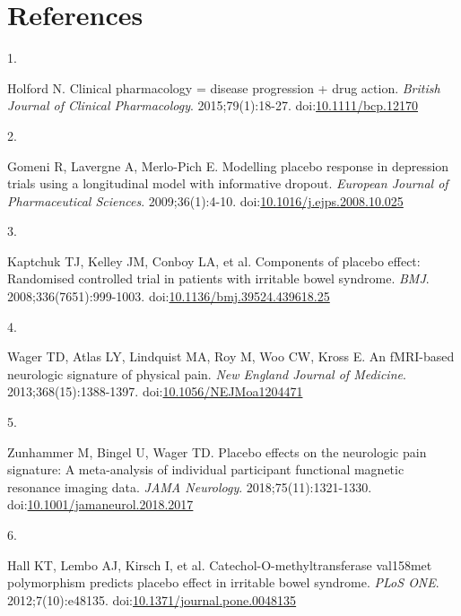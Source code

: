 \documentclass[
  11pt,
]{article}
\newlength{\cslhangindent}
\newlength{\csllabelwidth}
\newenvironment{CSLReferences}[2] %
 {\begin{list}{}{%
  \setlength{\itemindent}{0pt}
  \setlength{\leftmargin}{0pt}
  \setlength{\parsep}{0pt}
  \ifodd #1
   \setlength{\leftmargin}{\cslhangindent}
   \setlength{\itemindent}{-1\cslhangindent}
  \fi
  \setlength{\itemsep}{#2\baselineskip}}}
 {\end{list}}
\newcommand{\CSLLeftMargin}[1]{\parbox[t]{\csllabelwidth}{\strut#1\strut}}
\newcommand{\CSLRightInline}[1]{\parbox[t]{\linewidth - \csllabelwidth}{\strut#1\strut}}
\begin{document}
\section{References}\label{references}

\protect{}\label{refs}
\begin{CSLReferences}{0}{1}
\CSLLeftMargin{1. }%
\CSLRightInline{Holford N. Clinical pharmacology = disease progression + drug action. \emph{British Journal of Clinical Pharmacology}. 2015;79(1):18-27. doi:\href{https://doi.org/10.1111/bcp.12170}{10.1111/bcp.12170}}

\CSLLeftMargin{2. }%
\CSLRightInline{Gomeni R, Lavergne A, Merlo-Pich E. Modelling placebo response in depression trials using a longitudinal model with informative dropout. \emph{European Journal of Pharmaceutical Sciences}. 2009;36(1):4-10. doi:\href{https://doi.org/10.1016/j.ejps.2008.10.025}{10.1016/j.ejps.2008.10.025}}

\CSLLeftMargin{3. }%
\CSLRightInline{{Kaptchuk TJ, Kelley JM, Conboy LA, et al.} Components of placebo effect: Randomised controlled trial in patients with irritable bowel syndrome. \emph{BMJ}. 2008;336(7651):999-1003. doi:\href{https://doi.org/10.1136/bmj.39524.439618.25}{10.1136/bmj.39524.439618.25}}

\CSLLeftMargin{4. }%
\CSLRightInline{Wager TD, Atlas LY, Lindquist MA, Roy M, Woo CW, Kross E. An {fMRI}-based neurologic signature of physical pain. \emph{New England Journal of Medicine}. 2013;368(15):1388-1397. doi:\href{https://doi.org/10.1056/NEJMoa1204471}{10.1056/NEJMoa1204471}}

\CSLLeftMargin{5. }%
\CSLRightInline{Zunhammer M, Bingel U, Wager TD. Placebo effects on the neurologic pain signature: A meta-analysis of individual participant functional magnetic resonance imaging data. \emph{JAMA Neurology}. 2018;75(11):1321-1330. doi:\href{https://doi.org/10.1001/jamaneurol.2018.2017}{10.1001/jamaneurol.2018.2017}}

\CSLLeftMargin{6. }%
\CSLRightInline{Hall KT, Lembo AJ, Kirsch I, et al. Catechol-{O}-methyltransferase val158met polymorphism predicts placebo effect in irritable bowel syndrome. \emph{PLoS ONE}. 2012;7(10):e48135. doi:\href{https://doi.org/10.1371/journal.pone.0048135}{10.1371/journal.pone.0048135}}


\end{CSLReferences}
\end{document}
